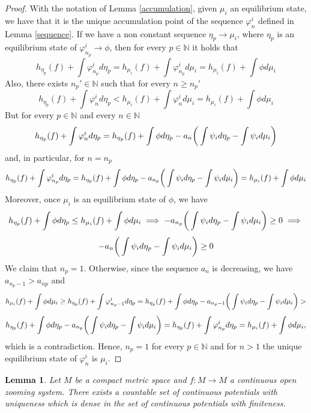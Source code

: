 \documentclass[12pt,a4paper]{amsart}
\theoremstyle{plain}
\newtheorem{lemma}{Lemma}[subsection]
\begin{document}
\begin{proof}
	With the notation of Lemma \ref{accumulation}, given $\mu_{i}$ an equilibrium state, we have that it is the unique accumulation point of the sequence $\varphi_{n}^{i}$ defined in Lemma \ref{sequence}. If we have a non constant sequence $\eta_{p} \to \mu_{i}$, where $\eta_{p}$ is an equilibrium state of $\varphi_{n_{p}}^{i} \to \phi$, then for every $p \in \mathbb{N}$ it holds that
	\[
	h_{\eta_{p}}(f) + \int \varphi_{n_{p}}^{i} d\eta_{p} = h_{\mu_{i}}(f) + \int \varphi_{n_{p}}^{i} d\mu_{i} = h_{\mu_{i}}(f) + \int \phi d\mu_{i}
	\]
	Also, there exists $n_{p}' \in \mathbb{N}$ such that for every $n \geq n_{p}'$
	\[
	h_{\eta_{p}}(f) + \int \varphi_{n}^{i} d\eta_{p} < h_{\mu_{i}}(f) + \int \varphi_{n}^{i} d\mu_{i} = h_{\mu_{i}}(f) + \int \phi d\mu_{i}
	\]
	But for every $p \in \mathbb{N}$ and every $n \in \mathbb{N}$
	\[
	h_{\eta_{p}}(f) + \int \varphi_{n}^{i} d\eta_{p} = h_{\eta_{p}}(f) + \int \phi d\eta_{p} - a_{n}\bigg{(}\int \psi_{i}d\eta_{p} - \int \psi_{i} d\mu_{i}\bigg{)}
	\]
	and, in particular, for $n = n_{p}$
	\[
	h_{\eta_{p}}(f) + \int \varphi_{n_{p}}^{i} d\eta_{p} = h_{\eta_{p}}(f) + \int \phi d\eta_{p} - a_{n_{p}}\bigg{(}\int \psi_{i}d\eta_{p} - \int \psi_{i} d\mu_{i}\bigg{)} = h_{\mu_{i}}(f) + \int \phi d\mu_{i}
	\]
	Moreover, once $\mu_{i}$ is an equilibrium state of $\phi$, we have
	\[
	h_{\eta_{p}}(f) + \int \phi d\eta_{p} \leq h_{\mu_{i}}(f) + \int \phi d\mu_{i} \implies - a_{n_{p}}\bigg{(}\int \psi_{i}d\eta_{p} - \int \psi_{i} d\mu_{i}\bigg{)} \geq 0 \implies 
	\]
	\[
	-a_{n}\bigg{(}\int \psi_{i}d\eta_{p} - \int \psi_{i} d\mu_{i}\bigg{)} \geq 0
	\]
	We claim that $n_{p} = 1$. Otherwise, since the sequence $a_{n}$ is decreasing, we have $a_{n_{p} -1} > a_{n{p}}$ and
	\[
	h_{\mu_{i}}(f) + \int \phi d\mu_{i} \geq h_{\eta_{p}}(f) + \int \varphi_{n_{p}-1}^{i} d\eta_{p} = h_{\eta_{p}}(f) + \int \phi d\eta_{p} - a_{n_{p}-1}\bigg{(}\int \psi_{i}d\eta_{p} - \int \psi_{i} d\mu_{i}\bigg{)} > 
	\]
	\[
	h_{\eta_{p}}(f) + \int \phi d\eta_{p} - a_{n_{p}}\bigg{(}\int \psi_{i}d\eta_{p} - \int \psi_{i} d\mu_{i}\bigg{)} = h_{\eta_{p}}(f) + \int \varphi_{n_{p}}^{i} d\eta_{p} = h_{\mu_{i}}(f) + \int \phi d\mu_{i},
	\]
	which is a contradiction. Hence, $n_{p} =1$ for every $p \in \mathbb{N}$ and for $n > 1$ the unique equilibrium state of $\varphi_{n}^{i}$ is $\mu_{i}$.
\end{proof}
\begin{lemma}\label{countable}
	Let $M$ be a compact metric space and $f: M \to M$ a continuous open zooming system. There exists a countable set of continuous potentials with uniqueness which is dense in the set of continuous potentials with finiteness.
\end{lemma} 
\end{document}
